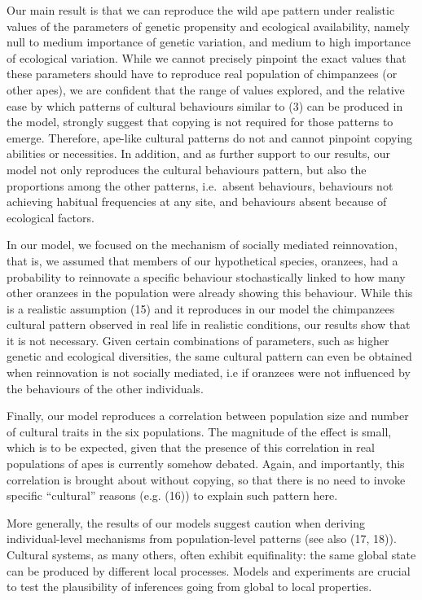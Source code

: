 \documentclass[9pt,twocolumn,twoside,]{pnas-new}
\begin{document}
Our main result is that we can reproduce the wild ape pattern under
realistic values of the parameters of genetic propensity and ecological
availability, namely null to medium importance of genetic variation, and
medium to high importance of ecological variation. While we cannot
precisely pinpoint the exact values that these parameters should have to
reproduce real population of chimpanzees (or other apes), we are
confident that the range of values explored, and the relative ease by
which patterns of cultural behaviours similar to (3) can be produced in
the model, strongly suggest that copying is not required for those
patterns to emerge. Therefore, ape-like cultural patterns do not and
cannot pinpoint copying abilities or necessities. In addition, and as
further support to our results, our model not only reproduces the
cultural behaviours pattern, but also the proportions among the other
patterns, i.e.~absent behaviours, behaviours not achieving habitual
frequencies at any site, and behaviours absent because of ecological
factors.

In our model, we focused on the mechanism of socially mediated
reinnovation, that is, we assumed that members of our hypothetical
species, oranzees, had a probability to reinnovate a specific behaviour
stochastically linked to how many other oranzees in the population were
already showing this behaviour. While this is a realistic assumption
(15) and it reproduces in our model the chimpanzees cultural pattern
observed in real life in realistic conditions, our results show that it
is not necessary. Given certain combinations of parameters, such as
higher genetic and ecological diversities, the same cultural pattern can
even be obtained when reinnovation is not socially mediated, i.e if
oranzees were not influenced by the behaviours of the other individuals.

Finally, our model reproduces a correlation between population size and
number of cultural traits in the six populations. The magnitude of the
effect is small, which is to be expected, given that the presence of
this correlation in real populations of apes is currently somehow
debated. Again, and importantly, this correlation is brought about
without copying, so that there is no need to invoke specific
``cultural'' reasons (e.g. (16)) to explain such pattern here.

More generally, the results of our models suggest caution when deriving
individual-level mechanisms from population-level patterns (see also
(17, 18)). Cultural systems, as many others, often exhibit equifinality:
the same global state can be produced by different local processes.
Models and experiments are crucial to test the plausibility of
inferences going from global to local properties.
\end{document}
